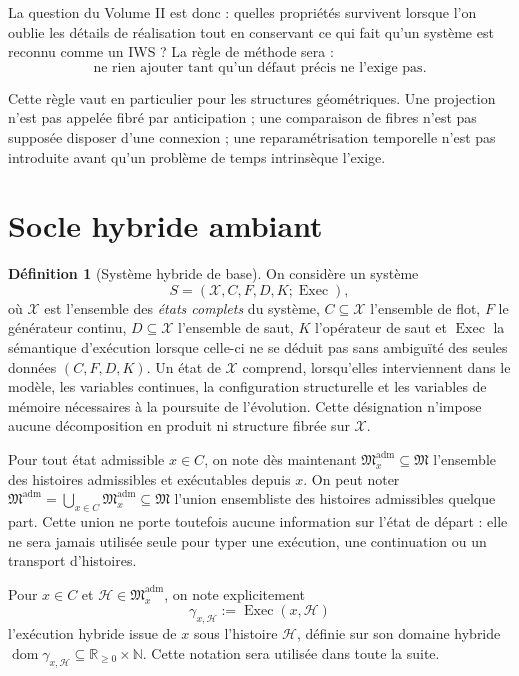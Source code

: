 \documentclass[11pt,a4paper]{article}
\theoremstyle{definition}
\newtheorem{definition}{Définition}[section]
\theoremstyle{remark}
\newcommand{\X}{\mathcal X}
\newcommand{\M}{\mathfrak M}
\newcommand{\Madm}{\mathfrak M^{\mathrm{adm}}}
\newcommand{\Exec}{\operatorname{Exec}}
\begin{document}
La question du Volume II est donc : quelles propriétés survivent lorsque l'on oublie les détails de réalisation tout en conservant ce qui fait qu'un système est reconnu comme un IWS ? La règle de méthode sera :
\[
\boxed{\text{ne rien ajouter tant qu'un défaut précis ne l'exige pas.}}
\]

Cette règle vaut en particulier pour les structures géométriques. Une projection n'est pas appelée fibré par anticipation ; une comparaison de fibres n'est pas supposée disposer d'une connexion ; une reparamétrisation temporelle n'est pas introduite avant qu'un problème de temps intrinsèque l'exige.

\section{Socle hybride ambiant}

\begin{definition}[Système hybride de base]
On considère un système
\[
S=(\X,C,F,D,K;\Exec),
\]
où $\X$ est l'ensemble des \emph{états complets} du système, $C\subseteq\X$ l'ensemble de flot, $F$ le générateur continu, $D\subseteq\X$ l'ensemble de saut, $K$ l'opérateur de saut et $\Exec$ la sémantique d'exécution lorsque celle-ci ne se déduit pas sans ambiguïté des seules données $(C,F,D,K)$. Un état de $\X$ comprend, lorsqu'elles interviennent dans le modèle, les variables continues, la configuration structurelle et les variables de mémoire nécessaires à la poursuite de l'évolution. Cette désignation n'impose aucune décomposition en produit ni structure fibrée sur $\X$.
\end{definition}

Pour tout état admissible $x\in C$, on note dès maintenant $\Madm_x\subseteq\M$ l'ensemble des histoires admissibles et exécutables depuis $x$. On peut noter $\Madm=\bigcup_{x\in C}\Madm_x\subseteq\M$ l'union ensembliste des histoires admissibles quelque part. Cette union ne porte toutefois aucune information sur l'état de départ : elle ne sera jamais utilisée seule pour typer une exécution, une continuation ou un transport d'histoires.

Pour $x\in C$ et $\mathcal H\in\Madm_x$, on note explicitement
\[
\boxed{\gamma_{x,\mathcal H}:=\Exec(x,\mathcal H)}
\]
l'exécution hybride issue de $x$ sous l'histoire $\mathcal H$, définie sur son domaine hybride $\operatorname{dom}\gamma_{x,\mathcal H}\subseteq\mathbb R_{\geq0}\times\mathbb N$. Cette notation sera utilisée dans toute la suite.
\end{document}
